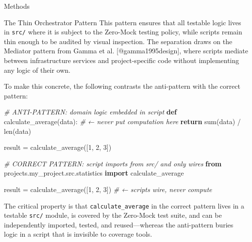 \documentclass[
  ignorenonframetext,
]{beamer}
\newenvironment{Shaded}{}{}
\newcommand{\BuiltInTok}[1]{\textcolor[rgb]{0.00,0.50,0.00}{#1}}
\newcommand{\CommentTok}[1]{\textcolor[rgb]{0.38,0.63,0.69}{\textit{#1}}}
\newcommand{\ControlFlowTok}[1]{\textcolor[rgb]{0.00,0.44,0.13}{\textbf{#1}}}
\newcommand{\DecValTok}[1]{\textcolor[rgb]{0.25,0.63,0.44}{#1}}
\newcommand{\ImportTok}[1]{\textcolor[rgb]{0.00,0.50,0.00}{\textbf{#1}}}
\newcommand{\KeywordTok}[1]{\textcolor[rgb]{0.00,0.44,0.13}{\textbf{#1}}}
\newcommand{\NormalTok}[1]{#1}
\newcommand{\OperatorTok}[1]{\textcolor[rgb]{0.40,0.40,0.40}{#1}}
\begin{document}
\begin{frame}[fragile]{Methods}
\begin{block}{The Thin Orchestrator Pattern}
This pattern ensures that all testable logic lives in \texttt{src/}
where it is subject to the Zero-Mock testing policy, while scripts
remain thin enough to be audited by visual inspection. The separation
draws on the Mediator pattern from Gamma et al. {[}@gamma1995design{]},
where scripts mediate between infrastructure services and
project-specific code without implementing any logic of their own.

To make this concrete, the following contrasts the anti-pattern with the
correct pattern:

\begin{Shaded}
\begin{Highlighting}[]
\CommentTok{\# ANTI{-}PATTERN: domain logic embedded in script}
\KeywordTok{def}\NormalTok{ calculate\_average(data):          }\CommentTok{\# ← never put computation here}
    \ControlFlowTok{return} \BuiltInTok{sum}\NormalTok{(data) }\OperatorTok{/} \BuiltInTok{len}\NormalTok{(data)}

\NormalTok{result }\OperatorTok{=}\NormalTok{ calculate\_average([}\DecValTok{1}\NormalTok{, }\DecValTok{2}\NormalTok{, }\DecValTok{3}\NormalTok{])}

\CommentTok{\# CORRECT PATTERN: script imports from src/ and only wires}
\ImportTok{from}\NormalTok{ projects.my\_project.src.statistics }\ImportTok{import}\NormalTok{ calculate\_average}

\NormalTok{result }\OperatorTok{=}\NormalTok{ calculate\_average([}\DecValTok{1}\NormalTok{, }\DecValTok{2}\NormalTok{, }\DecValTok{3}\NormalTok{])  }\CommentTok{\# ← scripts wire, never compute}
\end{Highlighting}
\end{Shaded}

The critical property is that \texttt{calculate\_average} in the correct
pattern lives in a testable \texttt{src/} module, is covered by the
Zero-Mock test suite, and can be independently imported, tested, and
reused---whereas the anti-pattern buries logic in a script that is
invisible to coverage tools.
\end{block}
\end{frame}
\end{document}
